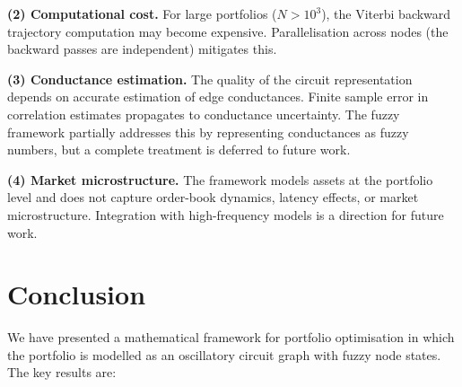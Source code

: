 \documentclass[twocolumn,10pt]{article}
\theoremstyle{remark}
\begin{document}
\textbf{(2) Computational cost.}  For large portfolios ($N > 10^3$), the Viterbi backward trajectory computation may become expensive.  Parallelisation across nodes (the backward passes are independent) mitigates this.

\textbf{(3) Conductance estimation.}  The quality of the circuit representation depends on accurate estimation of edge conductances.  Finite sample error in correlation estimates propagates to conductance uncertainty.  The fuzzy framework partially addresses this by representing conductances as fuzzy numbers, but a complete treatment is deferred to future work.

\textbf{(4) Market microstructure.}  The framework models assets at the portfolio level and does not capture order-book dynamics, latency effects, or market microstructure.  Integration with high-frequency models is a direction for future work.


\section{Conclusion}
\label{sec:conclusion}

We have presented a mathematical framework for portfolio optimisation in which the portfolio is modelled as an oscillatory circuit graph with fuzzy node states.  The key results are:
\end{document}
